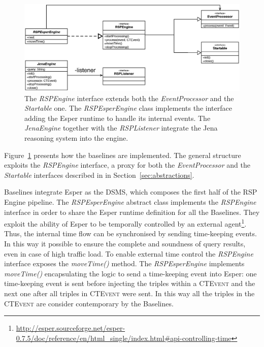\begin{figure}[tbh]
  \centering
	\includegraphics[width=\linewidth]{images/uml_baselines_general}
	\caption[\textit{RSPEngine} Implementation Through Esper and Jena - UML Schema]{The \textit{RSPEngine} interface extends both the \textit{EventProcessor} and the \textit{Startable} one. The \textit{RSPEsperEngine} class implements the interface adding the Esper runtime to handle its internal events. The \textit{JenaEngine} together with the \textit{RSPListener} integrate the Jena reasoning system into the engine.}
  	\label{fig:uml_baselines_general}
\end{figure}

\noindent Figure~\ref{fig:uml_baselines_general} presents how the baselines are implemented. The general structure exploits the \textit{RSPEngine} interface, a proxy for both the \textit{EventProcessor} and the \textit{Startable} interfaces described in  in Section~\ref{sec:abstractions}. 

\name Baselines integrate Esper as the DSMS, which composes the first half of the RSP Engine pipeline. The \textit{RSPEsperEngine} abstract class implements the \textit{RSPEngine} interface in order to share the Esper runtime definition for all the Baselines.  They exploit the ability of Esper to be temporally controlled by an external agent\footnote{\url{http://esper.sourceforge.net/esper-0.7.5/doc/reference/en/html_single/index.html#api-controlling-time}}. Thus, the internal time flow can be synchronised by sending time-keeping events. In this way it possible to ensure the complete and soundness of query results, even in case of high traffic load. To enable external time control the \textit{RSPEngine} interface exposes the \textit{moveTime()} method.  The \textit{RSPEsperEngine} implements \textit{moveTime()} encapsulating the logic to send a time-keeping event into Esper: one time-keeping event is sent before injecting the triples within a \textsc{CTEvent} and the next one after all triples in \textsc{CTEvent} were sent. In this way all the triples in the \textsc{CTEvent} are consider contemporary by the Baselines. 

